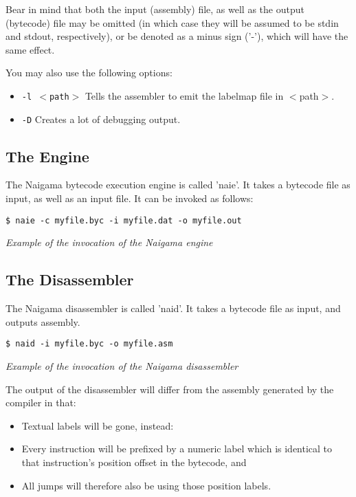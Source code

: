 Bear in mind that both the input (assembly) file, as well as the
output (bytecode) file may be omitted (in which case they will be
assumed to be stdin and stdout, respectively), or be denoted as
a minus sign ('-'), which will have the same effect.

You may also use the following options:

\begin{itemize}
\item \texttt{-l $<$path$>$} Tells the assembler to emit the labelmap
      file in $<$path$>$.
\item \texttt{-D} Creates a lot of debugging output.
\end{itemize}

\subsection{The Engine}

The Naigama bytecode execution engine is called 'naie'.
It takes a bytecode file as input, as well as an input file.
It can be invoked as follows:

\begin{myquote}
\begin{verbatim}
$ naie -c myfile.byc -i myfile.dat -o myfile.out
\end{verbatim}
\end{myquote}
\textit{Example of the invocation of the Naigama engine}

\subsection{The Disassembler}

The Naigama disassembler is called 'naid'.
It takes a bytecode file as input, and outputs assembly.

\begin{myquote}
\begin{verbatim}
$ naid -i myfile.byc -o myfile.asm
\end{verbatim}
\end{myquote}
\textit{Example of the invocation of the Naigama disassembler}

The output of the disassembler will differ from the assembly
generated by the compiler in that:

\begin{itemize}
\item Textual labels will be gone, instead:
\item Every instruction will be prefixed by a numeric label which
      is identical to that instruction's position offset in the bytecode, and
\item All jumps will therefore also be using those position labels.
\end{itemize}
